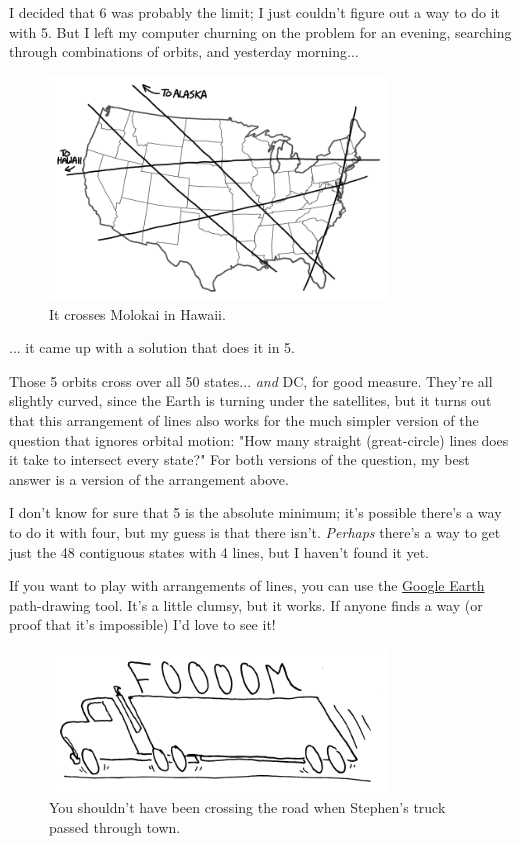 {{I decided that 6 was probably the limit; I just couldn't figure out a way to do it with 5. But I left my computer churning on the problem for an evening, searching through combinations of orbits, and yesterday morning...}

\begin{figure}[!htbp]
\centering
\includegraphics[scale=0.5, max width=0.8\textwidth]{imgs/a/113/five.png}
\caption{It crosses Molokai in Hawaii.}
\end{figure}

{... it came up with a solution that does it in 5.}

{Those 5 orbits cross over all 50 states... \emph{and} DC, for good measure. They're all slightly curved, since the Earth is turning under the satellites, but it turns out that this arrangement of lines also works for the much simpler version of the question that ignores orbital motion: "How many straight (great-circle) lines does it take to intersect every state?" For both versions of the question, my best answer is a version of the arrangement above.}

{I don't know for sure that 5 is the absolute minimum; it's possible there's a way to do it with four, but my guess is that there isn't. \emph{Perhaps} there's a way to get just the 48 contiguous states with 4 lines, but I haven't found it yet.}

{If you want to play with arrangements of lines, you can use the \href{https://www.google.com/earth/}{Google Earth} path-drawing tool. It's a little clumsy, but it works. If anyone finds a way (or proof that it's impossible) I'd love to see it!}

\begin{figure}[!htbp]
\centering
\includegraphics[scale=0.5, max width=0.8\textwidth]{imgs/a/113/truck.png}
\caption{You shouldn't have been crossing the road when Stephen's truck passed through town.}
\end{figure}

}
